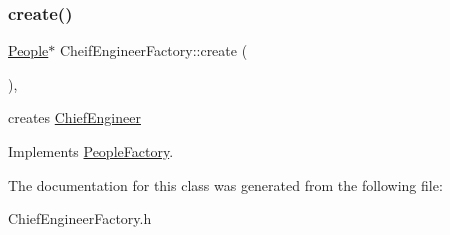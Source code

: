 \subsubsection{\texorpdfstring{create()}{create()}}
{\footnotesize\ttfamily \hyperlink{classPeople}{People}$\ast$ Cheif\+Engineer\+Factory\+::create (\begin{DoxyParamCaption}{ }\end{DoxyParamCaption})\hspace{0.3cm}{\ttfamily [inline]}, {\ttfamily [virtual]}}

creates \hyperlink{classChiefEngineer}{Chief\+Engineer} 

Implements \hyperlink{classPeopleFactory}{People\+Factory}.



The documentation for this class was generated from the following file\+:\begin{DoxyCompactItemize}
\item 
Chief\+Engineer\+Factory.\+h\end{DoxyCompactItemize}
